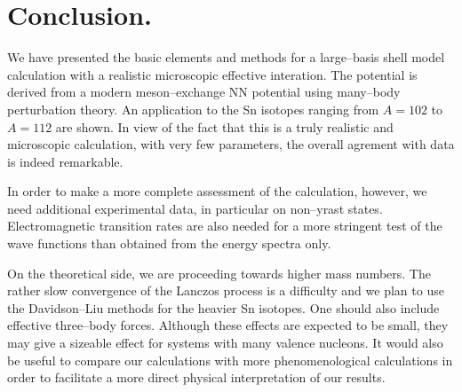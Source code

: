 \section{Conclusion.}
%
We have presented the basic elements and methods
 for a  large--basis shell model calculation with  a realistic microscopic
effective interation.
The potential is derived from a modern meson--exchange NN potential using
many--body perturbation theory. 
An application to the Sn isotopes ranging from
$A = 102$ to $A = 112$ are shown.  
In view of the fact that this is a truly realistic and microscopic calculation,
with very few parameters, the overall agrement with data is indeed remarkable.

In order to make a more complete assessment of the calculation, however,
we need additional experimental data, in particular on non--yrast states.
Electromagnetic transition rates are also needed for a more 
stringent test of the wave functions than obtained from the 
energy spectra only.


On the theoretical side, we are proceeding towards higher mass numbers.
The rather slow convergence of the Lanczos process is a difficulty and 
we plan to use the Davidson--Liu methods for the heavier Sn isotopes.
One should also include effective three--body forces.
Although these effects are expected to be small, they 
may give a sizeable effect for systems with many valence nucleons. 
It would also be useful to compare our calculations with
more phenomenological   calculations in order to facilitate a 
more direct physical interpretation of our  results.





